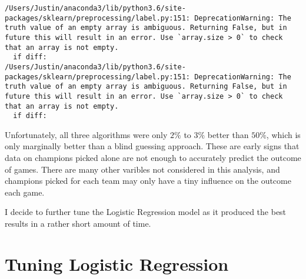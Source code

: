 \documentclass[11pt]{article}
\begin{document}
    \begin{Verbatim}[commandchars=\\\{\}]
/Users/Justin/anaconda3/lib/python3.6/site-packages/sklearn/preprocessing/label.py:151: DeprecationWarning: The truth value of an empty array is ambiguous. Returning False, but in future this will result in an error. Use `array.size > 0` to check that an array is not empty.
  if diff:
/Users/Justin/anaconda3/lib/python3.6/site-packages/sklearn/preprocessing/label.py:151: DeprecationWarning: The truth value of an empty array is ambiguous. Returning False, but in future this will result in an error. Use `array.size > 0` to check that an array is not empty.
  if diff:

    \end{Verbatim}

    Unfortunately, all three algorithms were only \(2\%\) to \(3\%\) better
than \(50\%\), which is only marginally better than a blind guessing
approach. These are early signs that data on champions picked alone are
not enough to accurately predict the outcome of games. There are many
other varibles not considered in this analysis, and champions picked for
each team may only have a tiny influence on the outcome each game.

I decide to further tune the Logistic Regression model as it produced
the best results in a rather short amount of time.

    \section{Tuning Logistic Regression}\label{tuning-logistic-regression}
\end{document}
